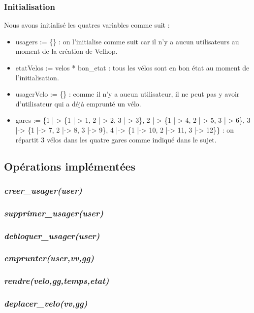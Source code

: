 \documentclass[12pt]{article}
\begin{document}
\subsubsection{Initialisation}
Nous avons initialisé les quatres variables comme suit :
\begin{itemize}
  \item usagers := \{\} : on l'initialise comme suit car il n'y a aucun utilisateurs au moment de la création de Velhop.
  \item etatVelos := velos * {bon\_etat} : tous les vélos sont en bon état au moment de l'initialisation.
  \item usagerVelo := \{\} : comme il n'y a aucun utilisateur, il ne peut pas y avoir d'utilisateur qui a déjà emprunté un vélo.
  \item gares := \{1 |-> \{1 |-> 1, 2 |-> 2, 3 |-> 3\}, 2 |-> \{1 |-> 4, 2 |-> 5, 3 |-> 6\}, 3 |-> \{1 |-> 7, 2 |-> 8, 3 |-> 9\}, 4 |-> \{1 |-> 10, 2 |-> 11, 3 |-> 12\}\} : on répartit 3 vélos dans les quatre gares comme indiqué dans le sujet.
\end{itemize}



\subsection{Opérations implémentées}
\subsubsection{\textit{creer\_usager(user)}}
\subsubsection{\textit{supprimer\_usager(user)}}
\subsubsection{\textit{debloquer\_usager(user)}}
\subsubsection{\textit{emprunter(user,vv,gg)}}
\subsubsection{\textit{rendre(velo,gg,temps,etat)}}
\subsubsection{\textit{deplacer\_velo(vv,gg)}}
\end{document}
